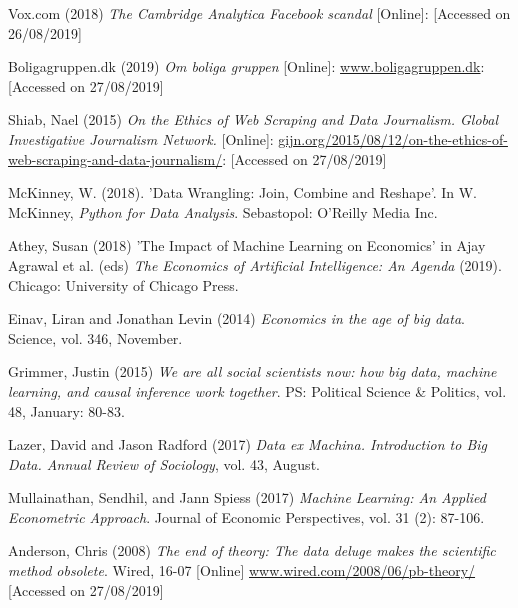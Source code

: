 \documentclass[12pt,a4paper]{article}
\begin{document}
Vox.com (2018) \textit{The Cambridge Analytica Facebook scandal} [Online]: \href{https://www.vox.com/2018/4/10/17207394/cambridge-analytica-facebook-zuckerberg-trump-privacy-scandal} [Accessed on 26/08/2019] \newline
 
Boligagruppen.dk (2019) \textit{Om boliga gruppen} [Online]: \href{https://www.boligagruppen.dk}{www.boligagruppen.dk}: [Accessed on 27/08/2019] \newline

Shiab, Nael (2015) \textit{On the Ethics of Web Scraping and Data Journalism. Global Investigative Journalism Network.} [Online]: \href{https://gijn.org/2015/08/12/on-the-ethics-of-web-scraping-and-data-journalism/}{gijn.org/2015/08/12/on-the-ethics-of-web-scraping-and-data-journalism/}: [Accessed on 27/08/2019] \newline

McKinney, W. (2018). 'Data Wrangling: Join, Combine and Reshape'. In W. McKinney, \textit{Python for Data Analysis}. Sebastopol: O'Reilly Media Inc. \newline

Athey, Susan (2018) 'The Impact of Machine Learning on Economics' in Ajay Agrawal et al. (eds) \textit{The Economics of Artificial Intelligence: An Agenda} (2019). Chicago: University of Chicago Press. \newline

Einav, Liran and Jonathan Levin (2014) \textit{Economics in the age of big data}. Science, vol. 346, November. \newline

Grimmer, Justin (2015) \textit{We are all social scientists now: how big data, machine learning, and causal inference work together}. PS: Political Science \& Politics, vol. 48, January: 80-83. \newline

Lazer, David and Jason Radford (2017) \textit{Data ex Machina. Introduction to Big Data. Annual Review of Sociology}, vol. 43, August. \newline

Mullainathan, Sendhil, and Jann Spiess (2017) \textit{Machine Learning: An Applied Econometric Approach}. Journal of Economic Perspectives, vol. 31 (2): 87-106. \newline

Anderson, Chris (2008) \textit{The end of theory: The data deluge makes the scientific method obsolete}. Wired, 16-07 [Online] \href{https://www.wired.com/2008/06/pb-theory/}{www.wired.com/2008/06/pb-theory/} [Accessed on 27/08/2019]\newline
\end{document}
